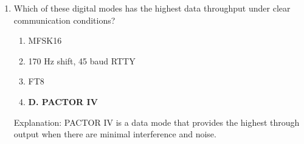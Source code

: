 \begin{enumerate}
      \item Which of these digital modes has the highest data throughput under clear communication conditions?
       \begin{enumerate}
        \item  MFSK16
        \item  170 Hz shift, 45 baud RTTY
        \item  FT8
        \item \textbf{D. PACTOR IV}
       \end{enumerate}
        \textcolor{myred}{Explanation:}
         PACTOR IV is a data mode that provides the highest through output when there are minimal interference and noise.
\end{enumerate}
